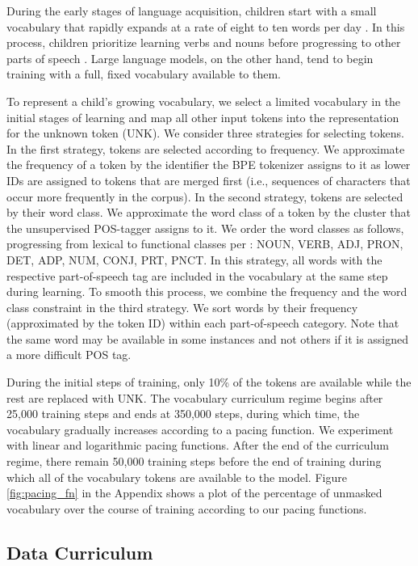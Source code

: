 During the early stages of language acquisition, children start with a small vocabulary that rapidly expands at a rate of eight to ten words per day \cite{weizman2001lexical}. In this process, children prioritize learning verbs and nouns before progressing to other parts of speech \cite{bergelson2015early}. Large language models, on the other hand, tend to begin training with a full, fixed vocabulary available to them. 

To represent a child's growing vocabulary, we select a limited vocabulary in the initial stages of learning and map all other input tokens into the representation for the unknown token (\textsc{UNK}). We consider three strategies for selecting tokens. In the first strategy, tokens are selected according to frequency. We approximate the frequency of a token by the identifier the BPE tokenizer assigns to it as lower IDs are assigned to tokens that are merged first (i.e., sequences of characters that occur more frequently in the corpus). In the second strategy, tokens are selected by their word class. We approximate the word class of a token by the cluster that the unsupervised POS-tagger assigns to it. We order the word classes as follows, progressing from lexical to functional classes per \citet{bergelson2015early}: NOUN, VERB, ADJ, PRON, DET, ADP, NUM, CONJ, PRT, PNCT. In this strategy, all words with the respective part-of-speech tag are included in the vocabulary at the same step during learning. To smooth this process, we combine the frequency and the word class constraint in the third strategy.
We sort words by their frequency (approximated by the token ID) within each part-of-speech category. Note that the same word may be available in some instances and not others if it is assigned a more difficult POS tag. 

During the initial steps of training, only 10\% of the tokens are available while the rest are replaced with UNK. The vocabulary curriculum regime begins after 25,000 training steps and ends at 350,000 steps, during which time, the vocabulary gradually increases according to a pacing function. We experiment with linear and logarithmic pacing functions.  After the end of the curriculum regime, there remain 50,000 training steps before the end of training during which all of the vocabulary tokens are available to the model. Figure \ref{fig:pacing_fn} in the Appendix shows a plot of the percentage of unmasked vocabulary over the course of training according to our pacing functions.


\subsection{Data Curriculum}
\label{subsec:data-cl}

